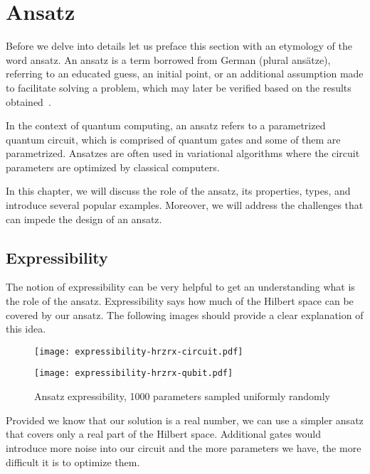 \chapter{Ansatz}\label{ch:ansatz}
Before we delve into details let us preface this section with an etymology of the word ansatz. An ansatz is a term borrowed from German (plural ansätze), referring to an educated guess, an initial point, or an additional assumption made to facilitate solving a problem, which may later be verified based on the results obtained~\cite{ansatz_etymology}.

In the context of quantum computing, an ansatz refers to a parametrized quantum circuit, which is comprised of quantum gates and some of them are parametrized. Ansatzes are often used in variational algorithms where the circuit parameters are optimized by classical computers.

In this chapter, we will discuss the role of the ansatz, its properties, types, and introduce several popular examples. Moreover, we will address the challenges that can impede the design of an ansatz.

\section{Expressibility}
The notion of expressibility can be very helpful to get an understanding what is the role of the ansatz. Expressibility says how much of the Hilbert space can be covered by our ansatz. The following images should provide a clear explanation of this idea.

\begin{figure}[H]
        \centering
        \begin{minipage}{0.4\linewidth}
            \centering
            \texttt{[image: expressibility-hrzrx-circuit.pdf]}
        \end{minipage}
        \begin{minipage}{0.4\linewidth}
            \centering
            \texttt{[image: expressibility-hrzrx-qubit.pdf]}
        \end{minipage}
        \caption{Ansatz expressibility, 1000 parameters sampled uniformly randomly}
\end{figure}

Provided we know that our solution is a real number, we can use a simpler ansatz that covers only a real part of the Hilbert space. Additional gates would introduce more noise into our circuit and the more parameters we have, the more difficult it is to optimize them.

